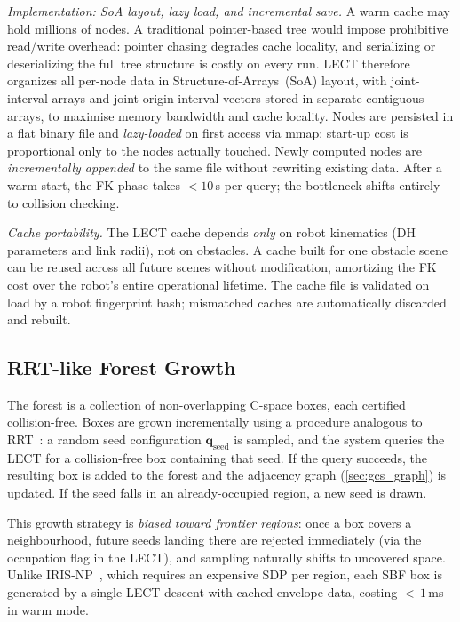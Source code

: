 \documentclass[journal]{IEEEtran}
\begin{document}
\emph{Implementation: SoA layout, lazy load, and incremental save.}
A warm cache may hold millions of nodes.
A traditional pointer-based tree would impose prohibitive read/write
overhead: pointer chasing degrades cache locality, and serializing or
deserializing the full tree structure is costly on every run.
LECT therefore organizes all per-node data in
Structure-of-Arrays~(SoA) layout, with joint-interval arrays and
joint-origin interval vectors stored in separate contiguous arrays,
to maximise memory bandwidth and cache locality.
Nodes are persisted in a flat binary file and \emph{lazy-loaded} on
first access via mmap; start-up cost is proportional only to the nodes
actually touched.
Newly computed nodes are \emph{incrementally appended} to the same file
without rewriting existing data.
After a warm start, the FK phase takes $<\!10$\,\textmu s per query; the
bottleneck shifts entirely to collision checking.

\emph{Cache portability.}
The LECT cache depends \emph{only} on robot kinematics (DH parameters
and link radii), not on obstacles.
A cache built for one obstacle scene can be reused across all future
scenes without modification, amortizing the FK cost over the robot's
entire operational lifetime.
The cache file is validated on load by a robot fingerprint hash;
mismatched caches are automatically discarded and rebuilt.

\subsection{RRT-like Forest Growth}\label{sec:forest_growth}

The forest is a collection of non-overlapping C-space boxes, each
certified collision-free.
Boxes are grown incrementally using a procedure analogous to
RRT~\cite{lavalle1998rapidly}: a random seed configuration
$\bm{q}_\text{seed}$ is sampled, and the system queries the LECT
for a collision-free box containing that seed.
If the query succeeds, the resulting box is added to the forest
and the adjacency graph (\cref{sec:gcs_graph}) is updated.
If the seed falls in an already-occupied region, a new seed is drawn.

This growth strategy is \emph{biased toward frontier regions}:
once a box covers a neighbourhood, future seeds landing there are
rejected immediately (via the occupation flag in the LECT), and
sampling naturally shifts to uncovered space.
Unlike IRIS-NP~\cite{werner2024fast}, which requires an expensive
SDP per region, each SBF box is generated by a single LECT descent
with cached envelope data, costing $<$\,$1$\,ms in warm mode.
\end{document}
